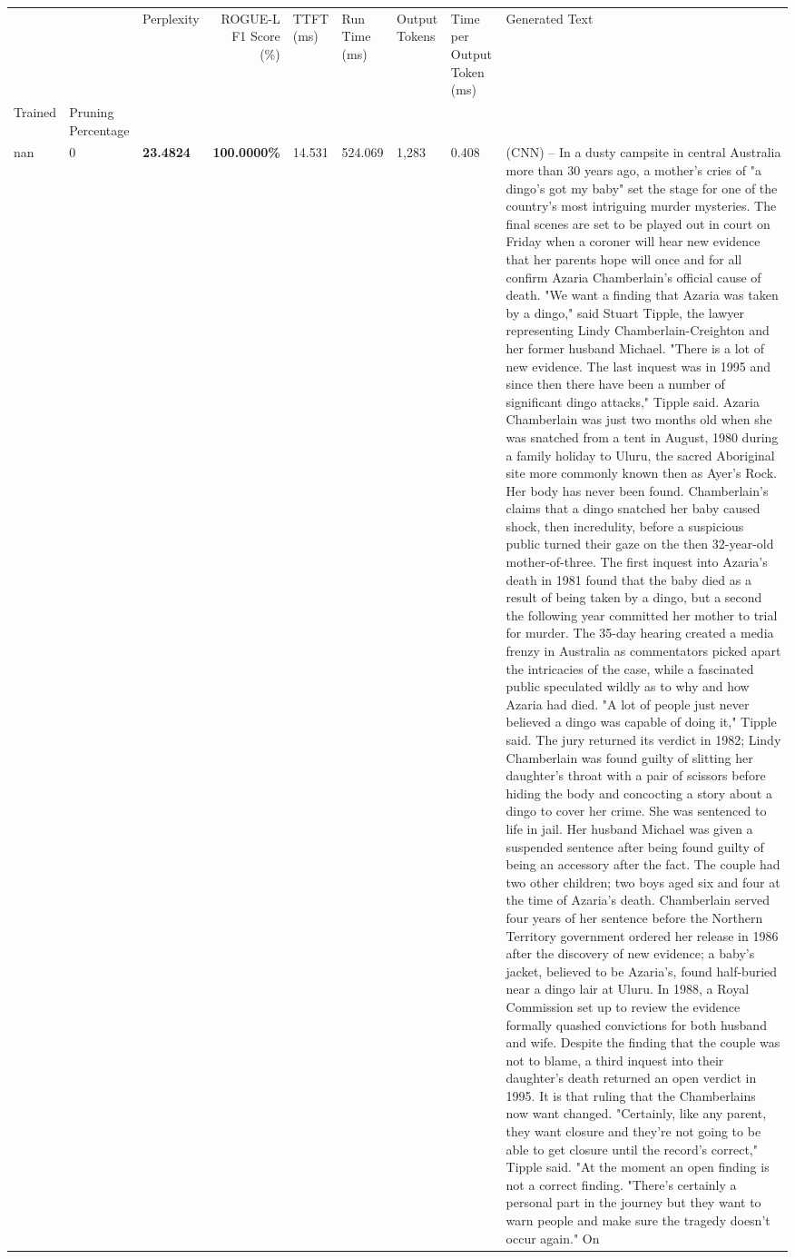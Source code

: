 \begin{table}[H]
\begin{tabular}{lllrlllll}
\toprule
 &  & Perplexity & ROGUE-L F1 Score (\%) & TTFT (ms) & Run Time (ms) & Output Tokens & Time per Output Token (ms) & Generated Text \\
Trained & Pruning Percentage &  &  &  &  &  &  &  \\
\midrule
nan & 0 & \bfseries 23.4824 & \bfseries 100.0000\% & 14.531 & 524.069 & 1,283 & 0.408 & (CNN) -- In a dusty campsite in central Australia more than 30 years ago, a mother's cries of "a dingo's got my baby" set the stage for one of the country's most intriguing murder mysteries. The final scenes are set to be played out in court on Friday when a coroner will hear new evidence that her parents hope will once and for all confirm Azaria Chamberlain's official cause of death. "We want a finding that Azaria was taken by a dingo," said Stuart Tipple, the lawyer representing Lindy Chamberlain-Creighton and her former husband Michael. "There is a lot of new evidence. The last inquest was in 1995 and since then there have been a number of significant dingo attacks," Tipple said. Azaria Chamberlain was just two months old when she was snatched from a tent in August, 1980 during a family holiday to Uluru, the sacred Aboriginal site more commonly known then as Ayer's Rock. Her body has never been found. Chamberlain's claims that a dingo snatched her baby caused shock, then incredulity, before a suspicious public turned their gaze on the then 32-year-old mother-of-three. The first inquest into Azaria's death in 1981 found that the baby died as a result of being taken by a dingo, but a second the following year committed her mother to trial for murder. The 35-day hearing created a media frenzy in Australia as commentators picked apart the intricacies of the case, while a fascinated public speculated wildly as to why and how Azaria had died. "A lot of people just never believed a dingo was capable of doing it," Tipple said. The jury returned its verdict in 1982; Lindy Chamberlain was found guilty of slitting her daughter's throat with a pair of scissors before hiding the body and concocting a story about a dingo to cover her crime. She was sentenced to life in jail. Her husband Michael was given a suspended sentence after being found guilty of being an accessory after the fact. The couple had two other children; two boys aged six and four at the time of Azaria's death. Chamberlain served four years of her sentence before the Northern Territory government ordered her release in 1986 after the discovery of new evidence; a baby's jacket, believed to be Azaria's, found half-buried near a dingo lair at Uluru. In 1988, a Royal Commission set up to review the evidence formally quashed convictions for both husband and wife. Despite the finding that the couple was not to blame, a third inquest into their daughter's death returned an open verdict in 1995. It is that ruling that the Chamberlains now want changed. "Certainly, like any parent, they want closure and they're not going to be able to get closure until the record's correct," Tipple said. "At the moment an open finding is not a correct finding. "There's certainly a personal part in the journey but they want to warn people and make sure the tragedy doesn't occur again." On 
\end{tabular}
\end{table}
